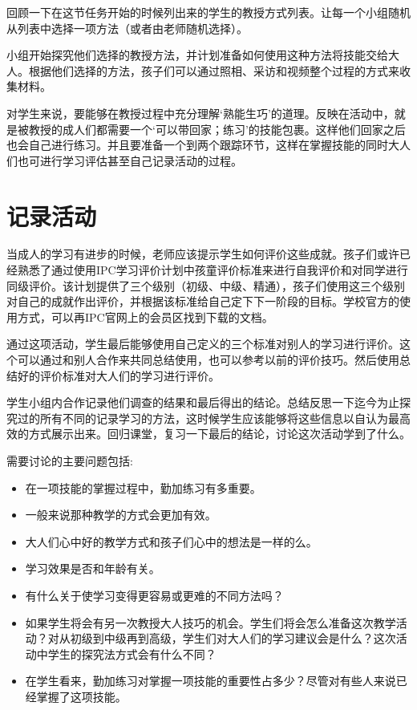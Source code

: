    回顾一下在这节任务开始的时候列出来的学生的教授方式列表。让每一个小组随机从列表中选择一项方法（或者由老师随机选择）。\par
   小组开始探究他们选择的教授方法，并计划准备如何使用这种方法将技能交给大人。根据他们选择的方法，孩子们可以通过照相、采访和视频整个过程的方式来收集材料。\par
    对学生来说，要能够在教授过程中充分理解‘熟能生巧’的道理。反映在活动中，就是被教授的成人们都需要一个‘可以带回家；练习’的技能包裹。这样他们回家之后也会自己进行练习。并且要准备一个到两个跟踪环节，这样在掌握技能的同时大人们也可进行学习评估甚至自己记录活动的过程。\par
    

\section{记录活动}
   当成人的学习有进步的时候，老师应该提示学生如何评价这些成就。孩子们或许已经熟悉了通过使用IPC学习评价计划中孩童评价标准来进行自我评价和对同学进行同级评价。该计划提供了三个级别（初级、中级、精通），孩子们使用这三个级别对自己的成就作出评价，并根据该标准给自己定下下一阶段的目标。学校官方的使用方式，可以再IPC官网上的会员区找到下载的文档。\par
   通过这项活动，学生最后能够使用自己定义的三个标准对别人的学习进行评价。这个可以通过和别人合作来共同总结使用，也可以参考以前的评价技巧。然后使用总结好的评价标准对大人们的学习进行评价。\par
   学生小组内合作记录他们调查的结果和最后得出的结论。总结反思一下迄今为止探究过的所有不同的记录学习的方法，这时候学生应该能够将这些信息以自认为最高效的方式展示出来。回归课堂，复习一下最后的结论，讨论这次活动学到了什么。\par
   需要讨论的主要问题包括:\par
   \begin{itemize}
     \item 在一项技能的掌握过程中，勤加练习有多重要。
     \item 一般来说那种教学的方式会更加有效。
     \item 大人们心中好的教学方式和孩子们心中的想法是一样的么。
     \item 学习效果是否和年龄有关。
     \item 有什么关于使学习变得更容易或更难的不同方法吗？
     \item 如果学生将会有另一次教授大人技巧的机会。学生们将会怎么准备这次教学活动？对从初级到中级再到高级，学生们对大人们的学习建议会是什么？这次活动中学生的探究法方式会有什么不同？
     \item 在学生看来，勤加练习对掌握一项技能的重要性占多少？尽管对有些人来说已经掌握了这项技能。
   \end{itemize}  

